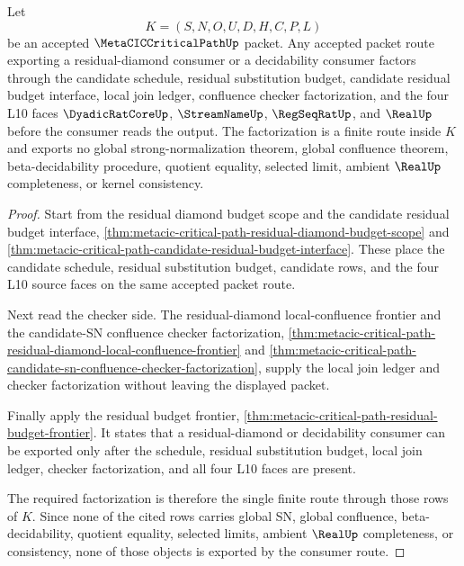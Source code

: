 \begin{theorem}
\label{thm:metacic-critical-path-residual-budget-factorization}
Let
$$
K=(S,N,O,U,D,H,C,P,L)
$$
be an accepted $\MetaCICCriticalPathUp$ packet. Any accepted packet route exporting a residual-diamond consumer or a decidability consumer factors through the candidate schedule, residual substitution budget, candidate residual budget interface, local join ledger, confluence checker factorization, and the four L10 faces $\DyadicRatCoreUp$, $\StreamNameUp$, $\RegSeqRatUp$, and $\RealUp$ before the consumer reads the output. The factorization is a finite route inside $K$ and exports no global strong-normalization theorem, global confluence theorem, beta-decidability procedure, quotient equality, selected limit, ambient $\RealUp$ completeness, or kernel consistency.
\end{theorem}
\begin{proof}
Start from the residual diamond budget scope and the candidate residual budget interface, \autoref{thm:metacic-critical-path-residual-diamond-budget-scope} and \autoref{thm:metacic-critical-path-candidate-residual-budget-interface}. These place the candidate schedule, residual substitution budget, candidate rows, and the four L10 source faces on the same accepted packet route.

Next read the checker side. The residual-diamond local-confluence frontier and the candidate-SN confluence checker factorization, \autoref{thm:metacic-critical-path-residual-diamond-local-confluence-frontier} and \autoref{thm:metacic-critical-path-candidate-sn-confluence-checker-factorization}, supply the local join ledger and checker factorization without leaving the displayed packet.

Finally apply the residual budget frontier, \autoref{thm:metacic-critical-path-residual-budget-frontier}. It states that a residual-diamond or decidability consumer can be exported only after the schedule, residual substitution budget, local join ledger, checker factorization, and all four L10 faces are present.

The required factorization is therefore the single finite route through those rows of $K$. Since none of the cited rows carries global SN, global confluence, beta-decidability, quotient equality, selected limits, ambient $\RealUp$ completeness, or consistency, none of those objects is exported by the consumer route.
\end{proof}

